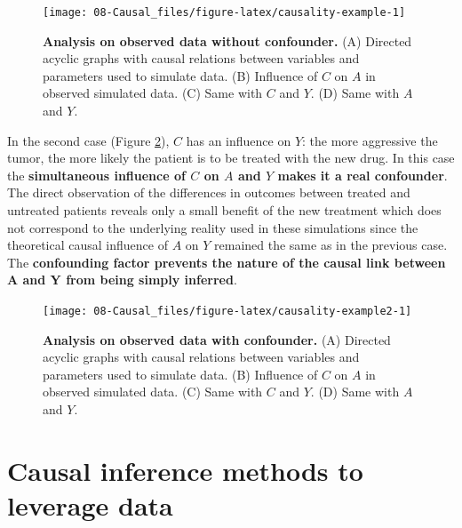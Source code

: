 \documentclass[a4paper,12pt,twoside,onecolumn,openright,final,oldfontcommands]{memoir}
\begin{document}
\begin{figure}

{\centering \texttt{[image: 08-Causal\_files/figure-latex/causality-example-1]} 

}

\caption[Analysis on observed data without confounder]{\textbf{Analysis on observed data
without confounder.} (A) Directed acyclic graphs with causal relations
between variables and parameters used to simulate data. (B) Influence of
\(C\) on \(A\) in observed simulated data. (C) Same with \(C\) and
\(Y\). (D) Same with \(A\) and \(Y\).}\label{fig:causality-example}
\end{figure}







In the second case (Figure \ref{fig:causality-example2}), \(C\) has an
influence on \(Y\): the more aggressive the tumor, the more likely the
patient is to be treated with the new drug. In this case the
\textbf{simultaneous influence of \(C\) on \(A\) and \(Y\) makes it a
real confounder}. The direct observation of the differences in outcomes
between treated and untreated patients reveals only a small benefit of
the new treatment which does not correspond to the underlying reality
used in these simulations since the theoretical causal influence of
\(A\) on \(Y\) remained the same as in the previous case. The
\textbf{confounding factor prevents the nature of the causal link
between A and Y from being simply inferred}.

\begin{figure}

{\centering \texttt{[image: 08-Causal\_files/figure-latex/causality-example2-1]} 

}

\caption[Analysis on observed data with confounder]{\textbf{Analysis on observed data with
confounder.} (A) Directed acyclic graphs with causal relations between
variables and parameters used to simulate data. (B) Influence of \(C\)
on \(A\) in observed simulated data. (C) Same with \(C\) and \(Y\). (D)
Same with \(A\) and \(Y\).}\label{fig:causality-example2}
\end{figure}







\section{Causal inference methods to leverage data}\label{causal-basic}
\end{document}
